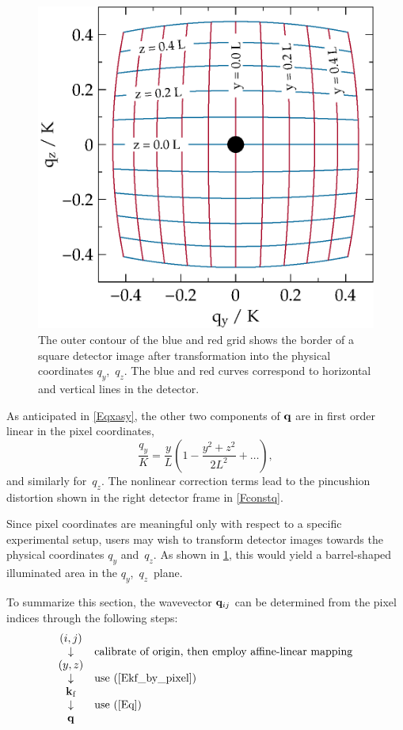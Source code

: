 \begin{figure}[t]
\begin{center}
\includegraphics[width=.47\textwidth]{fig/drawing/SAS_const_p_yz.ps}
\end{center}
\caption{The outer contour of the blue and red grid
shows the border of a square detector image
after transformation into the physical coordinates $q_y$,~$q_z$.
The blue and red curves correspond to horizontal and vertical lines in the detector.}
\label{Fconstp}
\end{figure}

As anticipated in \cref{Eqxasy},
the other two components of $\mathbf{q}$ are in first order linear in the pixel coordinates,
\begin{equation}
  \frac{q_y}{K}=\frac{y}{L}\left(1-\frac{y^2+z^2}{2L^2}+\ldots\right),
\end{equation}
and similarly for~$q_z$.
The nonlinear correction terms lead to the pincushion distortion
shown in the right detector frame in \cref{Fconstq}.
%
%
%

Since pixel coordinates are meaningful only
with respect to a specific experimental setup,
users may wish to transform detector images
towards the physical coordinates $q_y$ and~$q_z$.
As shown in \cref{Fconstp},
this would yield a barrel-shaped illuminated area
in the $q_y$,~$q_z$~plane.

To summarize this section,
the wavevector $\mathbf{q}_{ij}$ can be determined from the pixel indices
through the following steps:
\begin{equation}\label{Eqalgo}
  \begin{array}{cl}
      (i,j)&\\
      \downarrow&\mbox{calibrate of origin, then employ affine-linear mapping}\\
      (y,z)\\
      \downarrow&\mbox{use (\protect\ref{Ekf_by_pixel})}\\
      \mathbf{k}_{\text{f}}&\\
      \downarrow&\mbox{use (\protect\ref{Eq})}\\
      \mathbf{q}&\\
  \end{array}
\end{equation}

